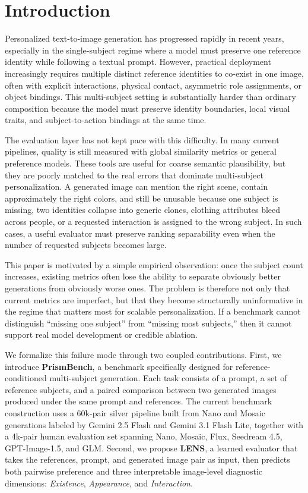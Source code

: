 \section{Introduction}

Personalized text-to-image generation has progressed rapidly in recent years, especially in the single-subject regime where a model must preserve one reference identity while following a textual prompt. However, practical deployment increasingly requires multiple distinct reference identities to co-exist in one image, often with explicit interactions, physical contact, asymmetric role assignments, or object bindings. This multi-subject setting is substantially harder than ordinary composition because the model must preserve identity boundaries, local visual traits, and subject-to-action bindings at the same time.

The evaluation layer has not kept pace with this difficulty. In many current pipelines, quality is still measured with global similarity metrics or general preference models. These tools are useful for coarse semantic plausibility, but they are poorly matched to the real errors that dominate multi-subject personalization. A generated image can mention the right scene, contain approximately the right colors, and still be unusable because one subject is missing, two identities collapse into generic clones, clothing attributes bleed across people, or a requested interaction is assigned to the wrong subject. In such cases, a useful evaluator must preserve ranking separability even when the number of requested subjects becomes large.

This paper is motivated by a simple empirical observation: once the subject count increases, existing metrics often lose the ability to separate obviously better generations from obviously worse ones. The problem is therefore not only that current metrics are imperfect, but that they become structurally uninformative in the regime that matters most for scalable personalization. If a benchmark cannot distinguish ``missing one subject'' from ``missing most subjects,'' then it cannot support real model development or credible ablation.

We formalize this failure mode through two coupled contributions. First, we introduce \textbf{PrismBench}, a benchmark specifically designed for reference-conditioned multi-subject generation. Each task consists of a prompt, a set of reference subjects, and a paired comparison between two generated images produced under the same prompt and references. The current benchmark construction uses a 60k-pair silver pipeline built from Nano and Mosaic generations labeled by Gemini 2.5 Flash and Gemini 3.1 Flash Lite, together with a 4k-pair human evaluation set spanning Nano, Mosaic, Flux, Seedream 4.5, GPT-Image-1.5, and GLM. Second, we propose \textbf{LENS}, a learned evaluator that takes the references, prompt, and generated image pair as input, then predicts both pairwise preference and three interpretable image-level diagnostic dimensions: \emph{Existence}, \emph{Appearance}, and \emph{Interaction}.

